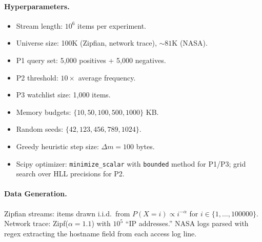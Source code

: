 \documentclass[preprint]{article}
\begin{document}
\paragraph{Hyperparameters.}
\begin{itemize}
    \item Stream length: $10^6$ items per experiment.
    \item Universe size: 100K (Zipfian, network trace), ${\sim}81$K (NASA).
    \item P1 query set: 5,000 positives + 5,000 negatives.
    \item P2 threshold: $10\times$ average frequency.
    \item P3 watchlist size: 1,000 items.
    \item Memory budgets: $\{10, 50, 100, 500, 1000\}$ KB.
    \item Random seeds: $\{42, 123, 456, 789, 1024\}$.
    \item Greedy heuristic step size: $\Delta m = 100$ bytes.
    \item Scipy optimizer: \texttt{minimize\_scalar} with \texttt{bounded} method for P1/P3; grid search over HLL precisions for P2.
\end{itemize}

\paragraph{Data Generation.}
Zipfian streams: items drawn i.i.d.\ from $P(X=i) \propto i^{-\alpha}$ for $i \in \{1, \ldots, 100000\}$. Network trace: Zipf($\alpha=1.1$) with $10^5$ ``IP addresses.'' NASA logs parsed with regex extracting the hostname field from each access log line.
\end{document}
